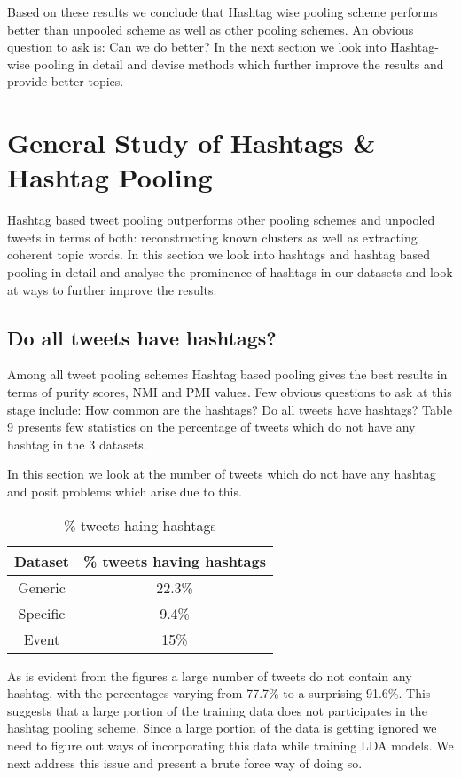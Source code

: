 \documentclass[10pt,a5paper,twoside]{article}
\begin{document}
Based on these results we conclude that Hashtag wise pooling scheme performs better than unpooled scheme as well as other pooling schemes. An obvious question to ask is: Can we do better? In the next section we look into Hashtag-wise pooling in detail and devise methods which further improve the results and provide better topics.

\section{General Study of Hashtags \& Hashtag Pooling}

Hashtag based tweet pooling outperforms other pooling schemes and unpooled tweets in terms of both: reconstructing known clusters as well as extracting coherent topic words. In this section we look into hashtags and hashtag based pooling in detail and analyse the prominence of hashtags in our datasets and look at ways to further improve the results.

\subsection{Do all tweets have hashtags?}
Among all tweet pooling schemes Hashtag based pooling gives the best results in terms of purity scores, NMI and PMI values. Few obvious questions to ask at this stage include: How common are the hashtags? Do all tweets have hashtags? Table 9 presents few statistics on the percentage of tweets which do not have any hashtag in the 3 datasets.

In this section we look at the number of tweets which do not have any hashtag and posit problems which arise due to this.


\begin{table}[!h]
\setcounter{table}{8}
\centering
	\begin{tabular}{|c|c|}
	\hline
	Dataset & \% tweets having hashtags\\
	\hline
	Generic & 22.3\%\\
	\hline
	Specific & 9.4\% \\
	\hline
	Event & 15\% \\
	\hline
	\end{tabular}
\caption{\% tweets haing hashtags}\label{Table}
\end{table}

As is evident from the figures a large number of tweets do not contain any hashtag, with the percentages varying from 77.7\% to a surprising 91.6\%. This suggests that a large portion of the training data does not participates in the hashtag pooling scheme. Since a large portion of the data is getting ignored we need to figure out ways of incorporating this data while training LDA models. We next address this issue and present a brute force way of doing so.
\end{document}
